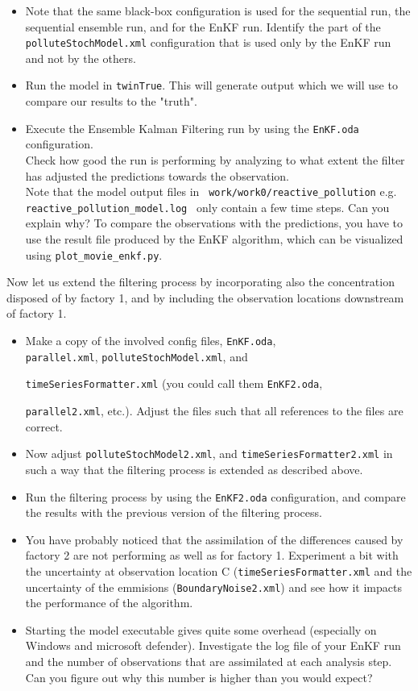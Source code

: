 \begin{itemize}
 \item Note that the same black-box configuration is used for the sequential
   run, the sequential ensemble run, and for the EnKF run. Identify the part of
   the {\tt polluteStochModel.xml} configuration that is used only by the EnKF
   run and not by the others.
 \item Run the model in {\tt twinTrue}. This will generate output which we will use to compare our results to the "truth".
 \item Execute the Ensemble Kalman Filtering run by using the {\tt EnKF.oda}
   configuration.\\ Check how good the run is performing by analyzing to what
   extent the filter has adjusted the predictions towards the
   observation.\\ Note that the model output files in {\tt
		work/work0/reactive\_pollution} e.g. {\tt reactive\_pollution\_model.log } only contain a few time steps. Can you explain
   why? To compare the observations with the predictions, you have to use
   the result file produced by the EnKF algorithm, which can be visualized using
   {\tt plot\_movie\_enkf.py}.
\end{itemize}

Now let us extend the filtering process by incorporating also the concentration
disposed of by factory 1, and by including the observation locations downstream of
factory 1.

\begin{itemize}
	\item Make a copy of the involved config files, {\tt EnKF.oda},\\ 
		{\tt parallel.xml}, {\tt polluteStochModel.xml}, and


		{\tt timeSeriesFormatter.xml} (you could call them
                {\tt EnKF2.oda}, 

                {\tt parallel2.xml}, etc.). Adjust the files such that all references to the files are correct.
	\item Now adjust {\tt polluteStochModel2.xml}, and {\tt timeSeriesFormatter2.xml}
	      in such a way that the filtering process is extended as described above.
 \item Run the filtering process by using the {\tt EnKF2.oda} configuration,
   and compare the results with the previous version of the filtering process.
 \item You have probably noticed that the assimilation of the differences caused by factory 2 are not performing as well as for factory 1. Experiment a bit with the uncertainty at observation location C ({\tt timeSeriesFormatter.xml} and the uncertainty of the emmisions ({\tt BoundaryNoise2.xml}) and see how it impacts the performance of the algorithm.
\item Starting the model executable gives quite some overhead (especially on Windows and microsoft defender). Investigate the log file of your EnKF run and the number of observations that are assimilated at each analysis step. Can you figure out why this number is higher than you would expect?


\end{itemize}

